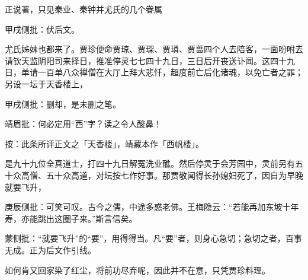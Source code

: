 \begin{parag}
    正说著，只见秦业、秦钟并尤氏的几个眷属\begin{note}甲戌侧批：伏后文。\end{note}尤氏姊妹也都来了。贾珍便命贾琼、贾琛、贾璘、贾蔷四个人去陪客，一面吩咐去请钦天监阴阳司来择日，推准停灵七七四十九日，三日后开丧送讣闻。这四十九日，单请一百单八众禅僧在大厅上拜大悲忏，超度前亡后化诸魂，以免亡者之罪；另设一坛于天香楼上，\begin{note}甲戌侧批：删却，是未删之笔。\end{note}\begin{note}靖眉批：何必定用“西”字？读之令人酸鼻！\end{note}\begin{subnote}按：此条所评正文之「天香楼」，靖藏本作「西帆楼」。\end{subnote}是九十九位全真道士，打四十九日解冤洗业醮。然后停灵于会芳园中，灵前另有五十众高僧、五十众高道，对坛按七作好事。那贾敬闻得长孙媳妇死了，因自为早晚就要飞升，\begin{note}庚辰侧批：可笑可叹。古今之儒，中途多惑老佛。王梅隐云：“若能再加东坡十年寿，亦能跳出这圈子来。”斯言信矣。\end{note}\begin{note}蒙侧批：“就要飞升”的“要”，用得得当。凡“要”者，则身心急切；急切之者，百事无成。正为后文作引线。\end{note}如何肯又回家染了红尘，将前功尽弃呢，因此并不在意，只凭贾珍料理。
\end{parag}


